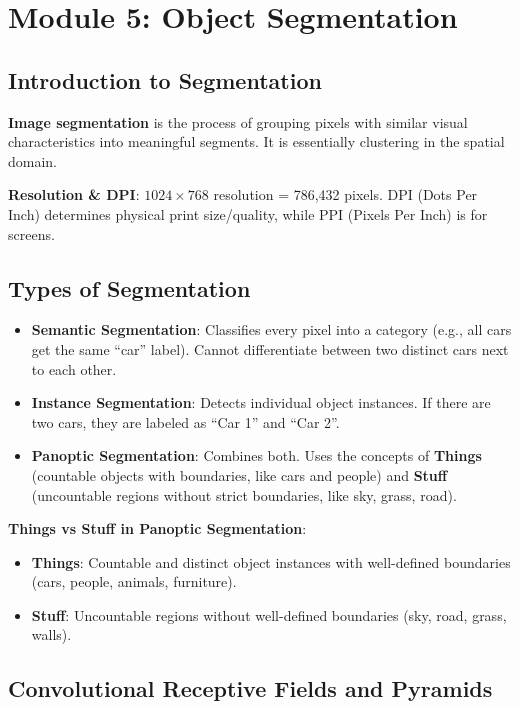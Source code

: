 \documentclass[11pt,a4paper]{article}
\begin{document}
\newpage

\section{Module 5: Object Segmentation}

\subsection{Introduction to Segmentation}

\textbf{Image segmentation} is the process of grouping pixels with similar visual characteristics into meaningful segments. It is essentially clustering in the spatial domain.

\textbf{Resolution \& DPI}: $1024 \times 768$ resolution = 786,432 pixels. DPI (Dots Per Inch) determines physical print size/quality, while PPI (Pixels Per Inch) is for screens.

\subsection{Types of Segmentation}

\begin{itemize}
    \item \textbf{Semantic Segmentation}: Classifies every pixel into a category (e.g., all cars get the same ``car'' label). Cannot differentiate between two distinct cars next to each other.
    \item \textbf{Instance Segmentation}: Detects individual object instances. If there are two cars, they are labeled as ``Car 1'' and ``Car 2''.
    \item \textbf{Panoptic Segmentation}: Combines both. Uses the concepts of \textbf{Things} (countable objects with boundaries, like cars and people) and \textbf{Stuff} (uncountable regions without strict boundaries, like sky, grass, road).
\end{itemize}

\textbf{Things vs Stuff in Panoptic Segmentation}:
\begin{itemize}
    \item \textbf{Things}: Countable and distinct object instances with well-defined boundaries (cars, people, animals, furniture).
    \item \textbf{Stuff}: Uncountable regions without well-defined boundaries (sky, road, grass, walls).
\end{itemize}

\subsection{Convolutional Receptive Fields and Pyramids}
\end{document}
